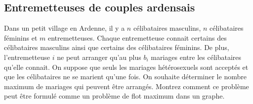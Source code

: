 \subsection{Entremetteuses de couples ardensais}
Dans un petit village en Ardenne, il y a $n$ célibataires masculins, $n$ célibataires féminins et $m$ entremetteuses. Chaque entremetteuse connait certains des célibataires masculins ainsi que certains des célibataires féminins. De plus, l'entremetteuse $i$ ne peut arranger qu'au plus $b_i$ mariages entre les célibataires qu'elle connait. On suppose que seuls les mariages hétérosexuels sont acceptés et que les célibataires ne se marient qu'une fois. On souhaite déterminer le nombre maximum de mariages qui peuvent être arrangés. Montrez comment ce problème peut être formulé comme un problème de flot maximum dans un graphe.

